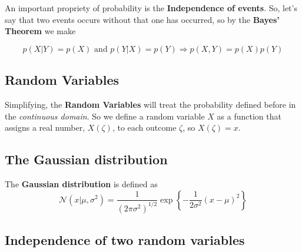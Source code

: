 \begin{frame}{\insertsubsection}

An important propriety of probability is the \textbf{Independence of events}. So, let's say that two events occurs without that one has occurred, so by the \textbf{Bayes' Theorem} we make

\begin{equation}
p(X|Y) = p(X) \text{ and } p(Y|X) = p(Y) \Rightarrow p(X,Y) = p(X)p(Y)
\end{equation}

\end{frame}

\subsection{Random Variables}

\begin{frame}{\insertsubsection}

Simplifying, the \textbf{Random Variables} will treat the probability defined before in the \textit{continuous domain}. So we define a random variable $X$ as a function that assigns a real number, $X(\zeta)$, to each outcome $\zeta$, so $X(\zeta) =  x$.

\end{frame}



\subsection{The Gaussian distribution}
\begin{frame}{\insertsubsection}
The \textbf{Gaussian distribution} is defined as
	\begin{equation}\label{eq:gaussian-distribution}
	\mathcal{N}(x|\mu,\sigma^2) = \frac{1}{(2\pi\sigma^2)^{1/2}}\exp\left\{-\frac{1}{2\sigma^2}(x-\mu)^2\right\}
	\end{equation}
\end{frame}


\subsection{Independence of two random variables}
\begin{frame}{\insertsubsection}
\end{frame}


